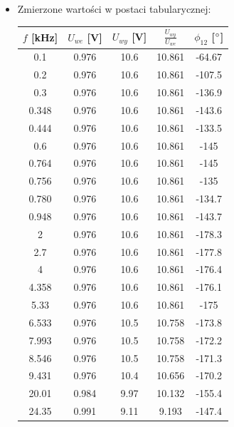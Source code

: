 \begin{itemize}
    \newpage
    \item Zmierzone wartości w postaci tabularycznej:
    \begin{center}
    \begin{tabular}{|c|c|c|c|c|}
         \hline
         $f$ [kHz] & $U_{we}$ [V] & $U_{wy}$ [V] & $\frac{U_{wy}}{U_{we}}$ &  $\phi_{12}$ [$\degree$] \\
         \hline
         0.1 & 0.976 & 10.6 & 10.861 &  -64.67 \\
         \hline
         0.2 & 0.976 & 10.6 & 10.861 & -107.5 \\
         \hline
         0.3 & 0.976 & 10.6 & 10.861 & -136.9 \\
         \hline
         0.348 & 0.976 & 10.6 & 10.861 & -143.6 \\
         \hline
         0.444 & 0.976 & 10.6 & 10.861 & -133.5 \\
         \hline
         0.6 & 0.976 & 10.6 & 10.861 & -145 \\
         \hline
         0.764 & 0.976 & 10.6 & 10.861 & -145 \\
         \hline
         0.756 & 0.976 & 10.6 & 10.861 & -135 \\
         \hline
         0.780 & 0.976 & 10.6 & 10.861 & -134.7 \\
         \hline
         0.948 & 0.976 & 10.6 & 10.861 & -143.7 \\
         \hline
         2 & 0.976 & 10.6 & 10.861 & -178.3 \\
         \hline
         2.7 & 0.976 & 10.6 & 10.861 & -177.8 \\
         \hline
         4 & 0.976 & 10.6 & 10.861 & -176.4 \\
         \hline
         4.358 & 0.976 & 10.6 & 10.861 & -176.1 \\
         \hline
         5.33 & 0.976 & 10.6 & 10.861 & -175 \\
         \hline
         6.533 & 0.976 & 10.5 & 10.758 & -173.8 \\
         \hline
         7.993 & 0.976 & 10.5 & 10.758 & -172.2 \\
         \hline
         8.546 & 0.976 & 10.5 & 10.758 & -171.3 \\
         \hline
         9.431 & 0.976 & 10.4 & 10.656 & -170.2 \\
         \hline
         20.01 & 0.984 & 9.97 & 10.132 & -155.4 \\
         \hline
         24.35 & 0.991 & 9.11 & 9.193 & -147.4 \\

\end{tabular}
\end{center}
\end{itemize}
